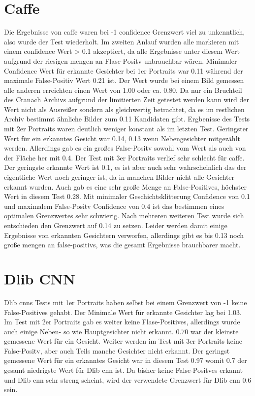 \section{Caffe}
Die Ergebnisse von \gls{caffe} waren bei -1 confidence Grenzwert viel zu unkenntlich, also wurde der Test wiederholt. Im zweiten Anlauf wurden alle markieren mit einem confidence Wert > 0.1 akzeptiert, da alle Ergebnisse unter diesem Wert aufgrund der riesigen mengen an Flase-Positv unbrauchbar wären.
Minimaler Confidence Wert für erkannte Gesichter bei 1er Portraits war 0.11 während der maximale False-Positiv Wert 0.21 ist. Der Wert wurde bei einem Bild gemessen alle anderen erreichten einen Wert von 1.00 oder ca. 0.80. Da nur ein Bruchteil des Cranach Archivs aufgrund der limitierten Zeit getestet werden kann wird der Wert nicht als Ausreißer sondern als gleichwertig betrachtet, da es im restlichen Archiv bestimmt ähnliche Bilder zum 0.11 Kandidaten gibt.
Ergbenisse des Tests mit 2er Portraits waren deutlich weniger konstant als im letzten Test. Geringster Wert für ein erkanntes Gesicht war 0.14, 0.13 wenn Nebengesichter mitgezählt werden. Allerdings gab es ein großes False-Positv sowohl vom Wert als auch von der Fläche her mit 0.4.
Der Test mit 3er Portraits verlief sehr schlecht für \gls{caffe}. Der geringste erkannte Wert ist 0.1, es ist aber auch sehr wahrscheinlich das der eigentliche Wert noch geringer ist, da in manchen Bilder nicht alle Gesichter erkannt wurden. Auch gab es eine sehr große Menge an False-Positives, höchster Wert in diesem Test 0.28.
Mit minimaler Geschichtsklitterung Confidence von 0.1 und maximalem False-Positv Confidence von 0.4 ist das bestimmen eines optimalen Grenzwertes sehr schwierig. Nach mehreren weiteren Test wurde sich entschieden den Grenzwert auf 0.14 zu setzen. Leider werden damit einige Ergebnisse von erkannten Gesichtern verworfen, allerdings gibt es bis 0.13 noch große mengen an false-positivs, was die gesamt Ergebnisse brauchbarer macht.

\section{Dlib CNN}
Dlib \gls{cnn}s Tests mit 1er Portraits haben selbst bei einem Grenzwert von -1 keine False-Positives gehabt. Der Minimale Wert für erkannte Gesichter lag bei 1.03.
Im Test mit 2er Portraits gab es weiter keine Flase-Positives, allerdings wurde auch einige Neben- so wie Hauptgesichter nicht erkannt. 0.70 war der kleinste gemessene Wert für ein Gesicht.
Weiter werden im Test mit 3er Portraits keine False-Positv, aber auch Teils manche Gesichter nicht erkannt. Der geringst gemessene Wert für ein erkanntes Gesicht war in diesem Test 0.97 womit 0.7 der gesamt niedrigste Wert für Dlib \gls{cnn} ist. Da bisher keine False-Positves erkannt und Dlib \gls{cnn} sehr streng scheint, wird der verwendete Grenzwert für Dlib \gls{cnn} 0.6 sein.

